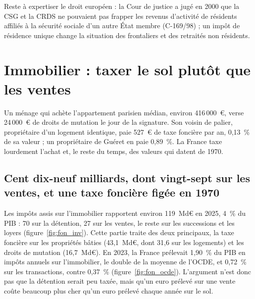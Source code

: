 \documentclass[11pt,a4paper]{article}
\begin{document}
Reste à expertiser le droit européen : la Cour de justice a jugé en 2000 que la CSG et la CRDS ne pouvaient pas frapper
les revenus d'activité de résidents affiliés à la sécurité sociale d'un autre État membre (C-169/98) ; un impôt de
résidence unique change la situation des frontaliers et des retraités non résidents.


\section{Immobilier : taxer le sol plutôt que les ventes}\label{sec:foncier}

Un ménage qui achète l'appartement parisien médian, environ 416\,000~€, verse 24\,000~€ de droits de mutation le jour
de la signature. Son voisin de palier, propriétaire d'un logement identique, paie 527~€ de taxe foncière par an, 0,13~\%
de sa valeur ; un propriétaire de Guéret en paie 0,89~\%. La France taxe lourdement l'achat et, le reste du temps, des
valeurs qui datent de 1970.

\subsection{Cent dix-neuf milliards, dont vingt-sept sur les ventes, et une taxe foncière figée en 1970}

Les impôts assis sur l'immobilier rapportent environ 119~Md€ en 2025, 4~\% du PIB : 70 sur la détention, 27 sur les
ventes, le reste sur les successions et les loyers (figure~\ref{fig:fon_inv}). Cette partie traite des deux principaux,
la taxe foncière sur les propriétés bâties (43,1~Md€, dont 31,6 sur les logements) et les droits de mutation
(16,7~Md€). En 2023, la France prélevait 1,90~\% du PIB en impôts annuels sur l'immobilier, le double de la moyenne de l'OCDE, et
0,72~\% sur les transactions, contre 0,37~\% (figure~\ref{fig:fon_ocde}). L'argument n'est donc pas que la détention
serait peu taxée, mais qu'un euro prélevé sur une vente coûte beaucoup plus cher qu'un euro prélevé chaque année sur le
sol.
\end{document}

